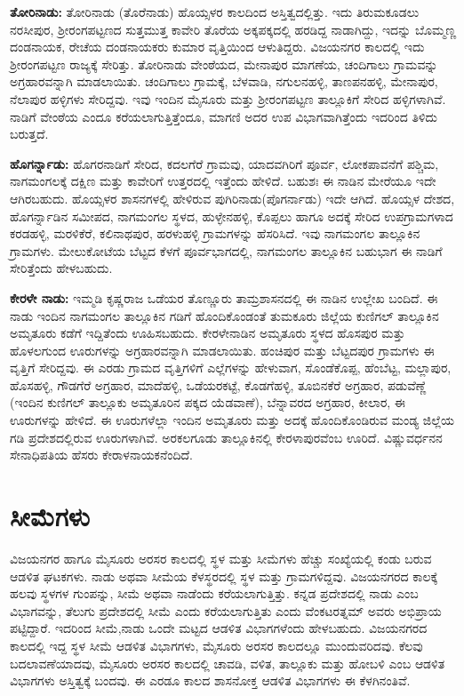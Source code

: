 \textbf{ತೋರಿನಾಡು:} ತೋರಿನಾಡು (ತೊರೆನಾಡು) ಹೊಯ್ಸಳರ ಕಾಲದಿಂದ ಅಸ್ತಿತ್ವದಲ್ಲಿತ್ತು. ಇದು ತಿರುಮಕೂಡಲು ನರಸೀಪುರ, ಶ‍್ರೀರಂಗಪಟ್ಟಣದ ಸುತ್ತಮುತ್ತ ಕಾವೇರಿ ತೊರೆಯ ಅಕ್ಕಪಕ್ಕದಲ್ಲಿ ಹರಡಿದ್ದ ನಾಡಾಗಿದ್ದು, ಇದನ್ನು ಬೊಮ್ಮಣ್ಣ ದಂಡನಾಯಕ, ರೇಚೆಯ ದಂಡನಾಯಕರು ಕುಮಾರ ವೃತ್ತಿಯಿಂದ ಆಳುತಿದ್ದರು. ವಿಜಯನಗರ ಕಾಲದಲ್ಲಿ ಇದು ಶ‍್ರೀರಂಗಪಟ್ಟಣ ರಾಜ್ಯಕ್ಕೆ ಸೇರಿತ್ತು. ತೋರಿನಾಡು ವೇಂಠೆಯದ, ಮೇನಾಪುರ ಮಾಗಣೆಯ, ಚಂದಿಗಾಲು ಗ್ರಾಮವನ್ನು ಅಗ್ರಹಾರವನ್ನಾಗಿ ಮಾಡಲಾಯಿತು. ಚಂದಿಗಾಲು ಗ್ರಾಮಕ್ಕೆ, ಬೆಳವಾಡಿ, ನಗುಲನಹಳ್ಳಿ, ತಾಣಪನಹಳ್ಳಿ, ಮೇನಾಪುರ, ನೆಲಾಪುರ ಹಳ್ಳಿಗಳು ಸೇರಿದ್ದವು. ಇವು ಇಂದಿನ ಮೈಸೂರು ಮತ್ತು ಶ‍್ರೀರಂಗಪಟ್ಟಣ ತಾಲ್ಲೂಕಿಗೆ ಸೇರಿದ ಹಳ್ಳಿಗಳಾಗಿವೆ. ನಾಡಿಗೆ ವೇಂಠೆಯ ಎಂದೂ ಕರೆಯಲಾಗುತ್ತಿತ್ತೆಂದೂ, ಮಾಗಣಿ ಅದರ ಉಪ ವಿಭಾಗವಾಗಿತ್ತೆಂದು ಇದರಿಂದ ತಿಳಿದು ಬರುತ್ತದೆ.

\textbf{ಹೊಗರ್ನ್ನಾಡು:} ಹೊಗರನಾಡಿಗೆ ಸೇರಿದ, ಕದಲಗೆರೆ ಗ್ರಾಮವು, ಯಾದವಗಿರಿಗೆ ಪೂರ್ವ, ಲೋಕಪಾವನೆಗೆ ಪಶ್ಚಿಮ, ನಾಗಮಂಗಲಕ್ಕೆ ದಕ್ಷಿಣ ಮತ್ತು ಕಾವೇರಿಗೆ ಉತ್ತರದಲ್ಲಿ ಇತ್ತೆಂದು ಹೇಳಿದೆ. ಬಹುಶಃ ಈ ನಾಡಿನ ಮೇರೆಯೂ ಇದೇ ಆಗಿರಬಹುದು. ಹೊಯ್ಸಳರ ಶಾಸನಗಳಲ್ಲಿ ಹೇಳಿರುವ ಪುಗಿರಿನಾಡು(ಪೊಗರ್ನಾಡು) ಇದೇ ಆಗಿದೆ. ಹೊಯ್ಸಳ ದೇಶದ, ಹೊಗರ್ನ್ನಾಡಿನ ಸಮೀಪದ, ನಾಗಮಂಗಲ ಸ್ಥಳದ, ಹುಳ್ಳೇನಹಳ್ಳಿ, ಕೊಪ್ಪಲು ಹಾಗೂ ಅದಕ್ಕೆ ಸೇರಿದ ಉಪಗ್ರಾಮಗಳಾದ ಕರಡಹಳ್ಳಿ, ಮರಳಿಕೆರೆ, ಕಲಿನಾಥಪುರ, ಹರಳುಹಳ್ಳಿ ಗ್ರಾಮಗಳನ್ನು ಹೆಸರಿಸಿದೆ. ಇವು ನಾಗಮಂಗಲ ತಾಲ್ಲೂಕಿನ ಗ್ರಾಮಗಳು. ಮೇಲುಕೋಟೆಯ ಬೆಟ್ಟದ ಕೆಳಗೆ ಪೂರ್ವಭಾಗದಲ್ಲಿ, ನಾಗಮಂಗಲ ತಾಲ್ಲೂಕಿನ ಬಹುಭಾಗ ಈ ನಾಡಿಗೆ ಸೇರಿತ್ತೆಂದು ಹೇಳಬಹುದು.

\textbf{ಕೇರಳೇ ನಾಡು:} ಇಮ್ಮಡಿ ಕೃಷ್ಣರಾಜ ಒಡೆಯರ ತೊಣ್ಣೂರು ತಾಮ್ರಶಾಸನದಲ್ಲಿ ಈ ನಾಡಿನ ಉಲ್ಲೇಖ ಬಂದಿದೆ. ಈ ನಾಡು ಇಂದಿನ ನಾಗಮಂಗಲ ತಾಲ್ಲೂಕಿನ ಗಡಿಗೆ ಹೊಂದಿಕೊಂಡಂತೆ ತುಮಕೂರು ಜಿಲ್ಲೆಯ ಕುಣಿಗಲ್​ ತಾಲ್ಲೂಕಿನ ಅಮೃತೂರು ಕಡೆಗೆ ಇದ್ದಿತೆಂದು ಊಹಿಸಬಹುದು. ಕೇರಳೇನಾಡಿನ ಅಮೃತೂರು ಸ್ಥಳದ ಹೊಸಪುರ ಮತ್ತು ಹೊಳಲಗುಂದ ಊರುಗಳನ್ನು ಅಗ್ರಹಾರವನ್ನಾಗಿ ಮಾಡಲಾಯಿತು. ಹಂಚಿಪುರ ಮತ್ತು ಬೆಟ್ಟದಪುರ ಗ್ರಾಮಗಳು ಈ ವೃತ್ತಿಗೆ ಸೇರಿದ್ದವು. ಈ ಎರಡು ಗ್ರಾಮದ ವೃತ್ತಿಗಳಿಗೆ ಎಲ್ಲೆಗಳನ್ನು ಹೇಳುವಾಗ, ಸೊಂಡೆಕೊಪ್ಪ, ಹೆಂಬೆಟ್ಟ, ಮಲ್ಲಾಪುರ, ಹೊಸಹಳ್ಳಿ, ಗೌಡಗೆರೆ ಅಗ್ರಹಾರ, ಮಾದೆಹಳ್ಳಿ, ಒಡೆಯರಕಟ್ಟೆ, ಕೊಡಗೆಹಳ್ಳಿ, ತೂಬಿನಕೆರೆ ಅಗ್ರಹಾರ, ಪಡುವೆಣ್ಣೆ (ಇಂದಿನ ಕುಣಿಗಲ್​ ತಾಲ್ಲೂಕು ಅಮೃತೂರಿನ ಪಕ್ಕದ ಯೆಡವಾಣೆ), ಬೆನ್ನಾವರದ ಅಗ್ರಹಾರ, ಕೀಲಾರ, ಈ ಊರುಗಳನ್ನು ಹೇಳಿದೆ. ಈ ಊರುಗಳೆಲ್ಲಾ ಇಂದಿನ ಅಮೃತೂರು ಮತ್ತು ಅದಕ್ಕೆ ಹೊಂದಿಕೊಂಡಿರುವ ಮಂಡ್ಯ ಜಿಲ್ಲೆಯ ಗಡಿ ಪ್ರದೇಶದಲ್ಲಿರುವ ಊರುಗಳಾಗಿವೆ. ಅರಕಲಗೂಡು ತಾಲ್ಲೂಕಿನಲ್ಲಿ ಕೇರಳಾಪುರವೆಂಬ ಊರಿದೆ. ವಿಷ್ಣುವರ್ಧನನ ಸೇನಾಧಿಪತಿಯ ಹೆಸರು ಕೇರಾಳನಾಯಕನೆಂದಿದೆ.


\section{ಸೀಮೆಗಳು}

ವಿಜಯನಗರ ಹಾಗೂ ಮೈಸೂರು ಅರಸರ ಕಾಲದಲ್ಲಿ ಸ್ಥಳ ಮತ್ತು ಸೀಮೆಗಳು ಹೆಚ್ಚು ಸಂಖ್ಯೆಯಲ್ಲಿ ಕಂಡು ಬರುವ ಆಡಳಿತ ಘಟಕಗಳು. ನಾಡು ಅಥವಾ ಸೀಮೆಯ ಕೆಳಸ್ಥರದಲ್ಲಿ ಸ್ಥಳ ಮತ್ತು ಗ್ರಾಮಗಳಿದ್ದವು. ವಿಜಯನಗರದ ಕಾಲಕ್ಕೆ ಹಲವು ಸ್ಥಳಗಳ ಗುಂಪನ್ನು, ಸೀಮೆ ಅಥವಾ ನಾಡೆಂದು ಕರೆಯಲಾಗುತ್ತಿತ್ತು. ಕನ್ನಡ ಪ್ರದೇಶದಲ್ಲಿ ನಾಡು ಎಂಬ ವಿಭಾಗವನ್ನು, ತೆಲುಗು ಪ್ರದೇಶದಲ್ಲಿ ಸೀಮೆ ಎಂದು ಕರೆಯಲಾಗುತ್ತಿತು ಎಂದು ವೆಂಕಟರತ್ನಮ್ ಅವರು ಅಭಿಪ್ರಾಯ ಪಟ್ಟಿದ್ದಾರೆ. ಇದರಿಂದ ಸೀಮೆ,ನಾಡು ಒಂದೇ ಮಟ್ಟದ ಆಡಳಿತ ವಿಭಾಗಗಳೆಂದು ಹೇಳಬಹುದು. ವಿಜಯನಗರದ ಕಾಲದಲ್ಲಿ ಇದ್ದ ಸ್ಥಳ ಸೀಮೆ ಆಡಳಿತ ವಿಭಾಗಗಳು, ಮೈಸೂರು ಅರಸರ ಕಾಲದಲ್ಲೂ ಮುಂದುವರಿದವು. ಕೆಲವು ಬದಲಾವಣೆಯಾದವು, ಮೈಸೂರು ಅರಸರ ಕಾಲದಲ್ಲಿ ಚಾವಡಿ, ವಳಿತ, ತಾಲ್ಲೂಕು ಮತ್ತು ಹೋಬಳಿ ಎಂಬ ಆಡಳಿತ ವಿಭಾಗಗಳು ಅಸ್ತಿತ್ವಕ್ಕೆ ಬಂದವು. ಈ ಎರಡೂ ಕಾಲದ ಶಾಸನೋಕ್ತ ಆಡಳಿತ ವಿಭಾಗಗಳು ಈ ಕೆಳಗಿನಂತಿವೆ.

